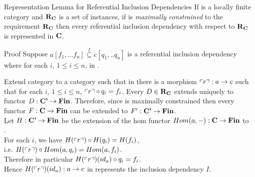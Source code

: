 \begin{frame}{Representation Lemma for Referential Inclusion Dependencies}
If \catcw is a locally finite category and $\textbf{R}_{\textbf{C}}$ is a set of instances, if \catcw is 
\textit{maximally constrained} to the requirement $\textbf{R}_{\textbf{C}}$ then
every referential inclusion dependency with respect to $\textbf{R}_{\textbf{C}}$ is represented in $\textbf{C}$.
\end{frame}

\begin{frame}{Proof}
Suppose $a[f_1,...f_n] \overset{I}{\subseteq} c[q_1,..q_n]$ is a referential inclusion dependency
where for each $i$, $1 \leq i \leq n$,
 in \catc.

Extend category \catcw to a category \catcpw such that in \catcpw there is
a morphism $\left\ulcorner r\right\urcorner: a \rightarrow c$ such that for each $i$, $1 \leq i \leq n$, 
$\left\ulcorner r\right\urcorner \circ q_i = f_i$.
Every $D \in \textbf{R}_{\textbf{C}}$ extends uniquely to functor $D: \textbf{C'} \rightarrow \textbf{Fin}$. Therefore, since \catcw is maximally constrained then every functor $F: \textbf{C} \rightarrow \textbf{Fin}$ can be extended to $F':\textbf{C'} \rightarrow \textbf{Fin}$. \\
\pause Let $H: \textbf{C'} \rightarrow \textbf{Fin}$ be the extension of the hom functor $Hom(a,-): \textbf{C} \rightarrow \textbf{Fin}$ to 
\catcp. \\
\pause For each $i$, we have $H(\left\ulcorner r\right\urcorner) \circ H(q_i) = H(f_i)$, \\
\pause \hspace {3cm} i.e. $H(\left\ulcorner r\right\urcorner) \circ Hom(a,q_i) = Hom(a,f_i)$. \\
\pause Therefore in particular $H(\left\ulcorner r\right\urcorner)(id_a) \circ q_i =  f_i$. \\
\pause Hence $H(\left\ulcorner r\right\urcorner)(id_a):a \rightarrow c$ in \catcw represents the inclusion dependency $I$.
\end{frame}

